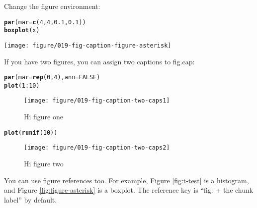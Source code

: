 \documentclass{article}\usepackage[]{graphicx}\usepackage[]{color}
\makeatletter
\def\maxwidth{ %
  \ifdim\Gin@nat@width>\linewidth
    \linewidth
  \else
    \Gin@nat@width
  \fi
}
\newcommand{\hlnum}[1]{\textcolor[rgb]{0.686,0.059,0.569}{#1}}%
\newcommand{\hlopt}[1]{\textcolor[rgb]{0,0,0}{#1}}%
\newcommand{\hlstd}[1]{\textcolor[rgb]{0.345,0.345,0.345}{#1}}%
\newcommand{\hlkwc}[1]{\textcolor[rgb]{0.333,0.667,0.333}{#1}}%
\newcommand{\hlkwd}[1]{\textcolor[rgb]{0.737,0.353,0.396}{\textbf{#1}}}%
\newenvironment{kframe}{%
 \def\at@end@of@kframe{}%
 \ifinner\ifhmode%
  \def\at@end@of@kframe{\end{minipage}}%
  \begin{minipage}{\columnwidth}%
 \fi\fi%
 \def\FrameCommand##1{\hskip\@totalleftmargin \hskip-\fboxsep
 \colorbox{shadecolor}{##1}\hskip-\fboxsep
     \hskip-\linewidth \hskip-\@totalleftmargin \hskip\columnwidth}%
 \MakeFramed {\advance\hsize-\width
   \@totalleftmargin\z@ \linewidth\hsize
   \@setminipage}}%
 {\par\unskip\endMakeFramed%
 \at@end@of@kframe}
\newenvironment{knitrout}{}{} %
\makeatother
\begin{document}
Change the figure environment:

\begin{knitrout}
\color{fgcolor}\begin{kframe}
\begin{alltt}
\hlkwd{par}\hlstd{(}\hlkwc{mar} \hlstd{=} \hlkwd{c}\hlstd{(}\hlnum{4}\hlstd{,} \hlnum{4}\hlstd{,} \hlnum{0.1}\hlstd{,} \hlnum{0.1}\hlstd{))}
\hlkwd{boxplot}\hlstd{(x)}
\end{alltt}
\end{kframe}\begin{figure*}[]

\texttt{[image: figure/019-fig-caption-figure-asterisk]} \caption[Figure * environment]{Figure * environment.\label{fig:figure-asterisk}}
\end{figure*}


\end{knitrout}


If you have two figures, you can assign two captions to fig.cap:

\begin{knitrout}
\color{fgcolor}\begin{kframe}
\begin{alltt}
\hlkwd{par}\hlstd{(}\hlkwc{mar} \hlstd{=} \hlkwd{rep}\hlstd{(}\hlnum{0}\hlstd{,} \hlnum{4}\hlstd{),} \hlkwc{ann} \hlstd{=} \hlnum{FALSE}\hlstd{)}
\hlkwd{plot}\hlstd{(}\hlnum{1}\hlopt{:}\hlnum{10}\hlstd{)}
\end{alltt}
\end{kframe}\begin{figure}[]


{\centering \texttt{[image: figure/019-fig-caption-two-caps1]} 

}

\caption[Hi figure one]{Hi figure one\label{fig:two-caps1}}
\end{figure}

\begin{kframe}\begin{alltt}
\hlkwd{plot}\hlstd{(}\hlkwd{runif}\hlstd{(}\hlnum{10}\hlstd{))}
\end{alltt}
\end{kframe}\begin{figure}[]


{\centering \texttt{[image: figure/019-fig-caption-two-caps2]} 

}

\caption[Hi figure two]{Hi figure two\label{fig:two-caps2}}
\end{figure}


\end{knitrout}


You can use figure references too. For example, Figure \ref{fig:t-test} is a histogram, and Figure \ref{fig:figure-asterisk} is a boxplot. The reference key is ``fig: + the chunk label'' by default.
\end{document}

